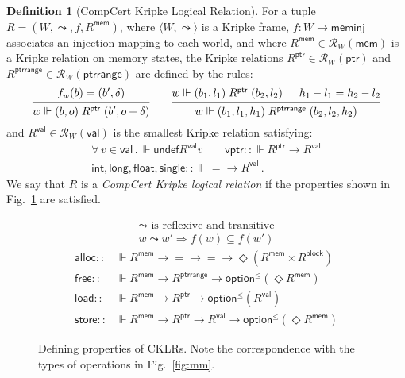 \documentclass[draft,11pt]{report}
\theoremstyle{definition}
\newtheorem{definition}[theorem]{Definition}
\newcommand{\kw}[1]{\ensuremath{ \mathsf{#1} }}
\begin{document}
\begin{definition}[CompCert Kripke Logical Relation] \label{def:cklr} %
For a tuple $R = (W, \leadsto, f, R^\kw{mem})$,
where
$\langle W, \leadsto \rangle$ is a Kripke frame,
$f : W \rightarrow \kw{meminj}$
associates an injection mapping to each world, and where
$R^\kw{mem} \in \mathcal{R}_{W}(\kw{mem})$
is a Kripke relation on memory states,
the Kripke relations
$R^\kw{ptr} \in \mathcal{R}_W(\kw{ptr})$ and
$R^\kw{ptrrange} \in \mathcal{R}_W(\kw{ptrrange})$
are defined by the rules:
\[
  \begin{prooftree}
    \hypo{f_w(b) = (b', \delta)}
    \infer1{w \Vdash (b, o) \mathrel{R^\kw{ptr}} (b', o + \delta)}
  \end{prooftree}
  \qquad
  \begin{prooftree}
    \hypo{w \Vdash (b_1, l_1) \mathrel{R^\kw{ptr}} (b_2, l_2)}
    \hypo{h_1 - l_1 = h_2 - l_2}
    \infer2{w \Vdash (b_1, l_1, h_1) \mathrel{R^\kw{ptrrange}} (b_2, l_2, h_2)}
  \end{prooftree}
\]
and
$R^\kw{val} \in \mathcal{R}_W(\kw{val})$
is the smallest Kripke relation satisfying:
\begin{gather*}
  \forall \, v \in \kw{val} \,.\,
    \Vdash \kw{undef} \mathrel{R^\kw{val}} v \qquad
  \kw{vptr} :: {\Vdash R^\kw{ptr} \rightarrow R^\kw{val}} \\
  \kw{int}, \kw{long}, \kw{float}, \kw{single} ::
    {\Vdash {=} \rightarrow R^\kw{val}} \,.
\end{gather*}
We say that $R$ is a \emph{CompCert Kripke logical relation}
if the properties shown in Fig.~\ref{fig:cklr-def} are satisfied.
\end{definition}

\begin{figure} %
  \begin{gather*}
    {\leadsto} \mbox{ is reflexive and transitive} \\
    w \leadsto w' \Rightarrow f(w) \subseteq f(w')
  \end{gather*}
  \begin{align*}
      \kw{alloc} ::
        &\Vdash R^\kw{mem} \rightarrow {=} \rightarrow {=} \rightarrow
        \Diamond (R^\kw{mem} \times R^\kw{block})
      \\
      \kw{free} ::
        &\Vdash R^\kw{mem} \rightarrow R^\kw{ptrrange} \rightarrow
        \kw{option}^\le(\Diamond R^\kw{mem})
      \\
      \kw{load} ::
        &\Vdash R^\kw{mem} \rightarrow R^\kw{ptr} \rightarrow
        \kw{option}^\le(R^\kw{val})
      \\
      \kw{store} ::
        &\Vdash R^\kw{mem} \rightarrow R^\kw{ptr} \rightarrow R^\kw{val} \rightarrow
        \kw{option}^\le(\Diamond R^\kw{mem})
  \end{align*}
  \caption{Defining properties of CKLRs.
    Note the correspondence with
    the types of operations in Fig.~\ref{fig:mm}.}
  \label{fig:cklr-def}
\end{figure}
\end{document}
